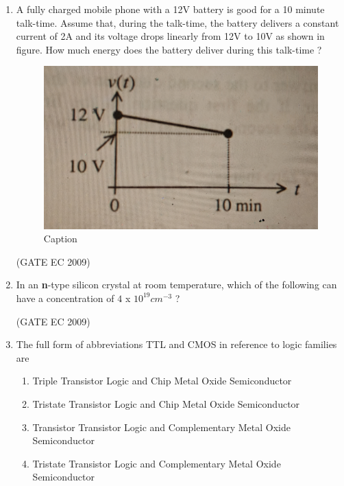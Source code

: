 \documentclass[journal,12pt,onecolumn]{IEEEtran}
\theoremstyle{remark}
\begin{document}
\begin{enumerate}[start=1, label={Q\arabic*.}]
\item A fully charged mobile phone with a 12V battery is good for a 10 minute talk-time. Assume that, during the talk-time, the battery delivers a constant current of 2A and its voltage drops linearly from 12V to 10V as shown in figure. How much energy does the battery deliver during this talk-time ?
\begin{figure}
    \centering
    \includegraphics[width=0.5\linewidth]{images/img_1.jpg}
    \caption{Caption}
    \label{fig:placeholder}
\end{figure}


\begin{enumerate}[label=(\Alph*)]
\end{enumerate}
\hfill (GATE EC 2009)
\item In an \textbf{n}-type silicon crystal at room temperature, which of the following can have a concentration of $4$ x $10^{19}  cm^{-3}$ ?

\begin{enumerate}[label=(\Alph*)]
\end{enumerate}
\hfill (GATE EC 2009)
\item The full form of abbreviations TTL and CMOS in reference to logic families are 
\begin{enumerate}[label=(\Alph*)]
\item Triple Transistor Logic and Chip Metal Oxide Semiconductor
\item Tristate Transistor Logic and Chip Metal Oxide Semiconductor
\item Transistor Transistor Logic and Complementary Metal Oxide Semiconductor
\item Tristate Transistor Logic and Complementary Metal Oxide Semiconductor


\end{enumerate}
\end{enumerate}
\end{document}
